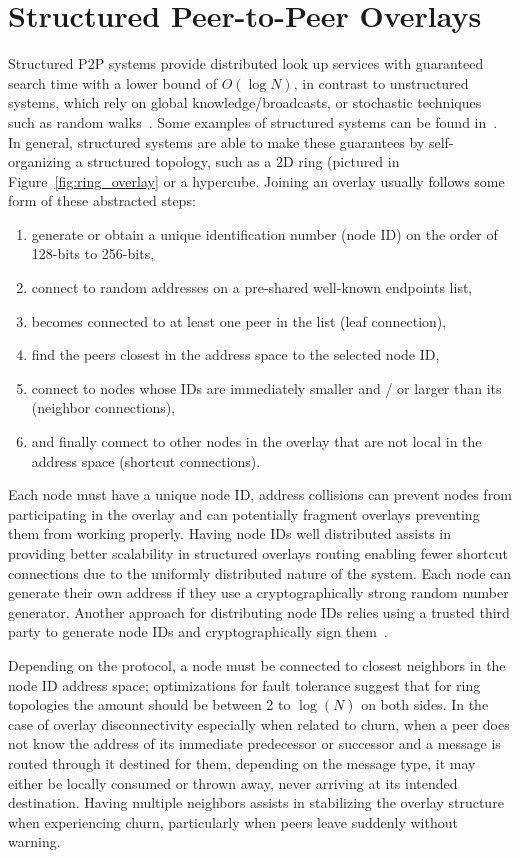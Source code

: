 \chapter{Structured Peer-to-Peer Overlays}
\label{structured_p2p}
Structured P2P systems provide distributed look up services with guaranteed
search time with a lower bound of $O(\log N)$, in contrast to unstructured
systems, which rely on global knowledge/broadcasts, or stochastic techniques
such as random walks~\cite{unstructured_v_structured}.  Some examples of
structured systems can be found in~\cite{pastry, chord, symphony, kademlia,
can, brunet}.  In general, structured systems are able to make these guarantees
by self-organizing a structured topology, such as a 2D ring (pictured in
Figure~\ref{fig:ring_overlay} or a hypercube.  Joining an overlay usually
follows some form of these abstracted steps:
\begin{enumerate}
\item generate or obtain a unique identification number (node ID) on the
order of 128-bits to 256-bits,
\item connect to random addresses on a pre-shared well-known endpoints list,
\item becomes connected to at least one peer in the list (leaf connection),
\item find the peers closest in the address space to the selected node ID,
\item connect to nodes whose IDs are immediately smaller and / or larger than
its (neighbor connections),
\item and finally connect to other nodes in the overlay that are not local in
the address space (shortcut connections).
\end{enumerate}

Each node must have a unique node ID, address collisions can prevent nodes from
participating in the overlay and can potentially fragment overlays preventing
them from working properly.  Having node IDs well distributed assists in
providing better scalability in structured overlays routing enabling fewer
shortcut connections due to the uniformly distributed nature of the system.
Each node can generate their own address if they use a cryptographically strong
random number generator.  Another approach for distributing node IDs relies
using a trusted third party to generate node IDs and cryptographically sign
them~\cite{secure_routing}.

Depending on the protocol, a node must be connected to closest neighbors in the
node ID address space; optimizations for fault tolerance suggest that for ring
topologies the amount should be between 2 to $\log(N)$ on both sides.  In the
case of overlay disconnectivity especially when related to churn, when a peer
does not know the address of its immediate predecessor or successor and a
message is routed through it destined for them, depending on the message type,
it may either be locally consumed or thrown away, never arriving at its
intended destination.  Having multiple neighbors assists in stabilizing the
overlay structure when experiencing churn, particularly when peers leave 
suddenly without warning.

